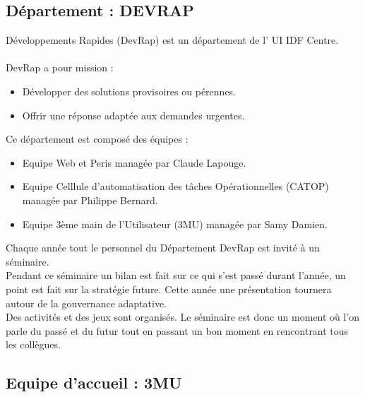 \documentclass[a4paper,twoside,12pt]{report}
\begin{document}
\subsection{Département : DEVRAP}
Développements Rapides (DevRap) est un département de l' UI IDF Centre.\\\\
DevRap a pour mission :
\begin{itemize}
\item Développer des solutions provisoires ou pérennes.
\item Offrir une réponse adaptée aux demandes urgentes.
\end{itemize}
Ce département est composé des équipes :
\begin{itemize}
\item Equipe Web et Peris managée par Claude Lapouge.
\item Equipe Celllule d'automatisation des tâches Opérationnelles (CATOP) managée par Philippe Bernard.
\item Equipe 3ème main de l'Utilisateur (3MU) managée par Samy Damien.
\end{itemize}
Chaque année tout le personnel du Département DevRap est invité à un séminaire.\\
Pendant ce séminaire un bilan est fait sur ce qui s'est passé durant l'année, un point est fait sur la stratégie future. Cette année une présentation tournera autour de la gouvernance adaptative.\\
Des activités et des jeux sont organisés. Le séminaire est donc un moment où l'on parle du passé et du futur tout en passant un bon moment en rencontrant tous les collègues. 
\subsection{Equipe d'accueil : 3MU}
\end{document}
